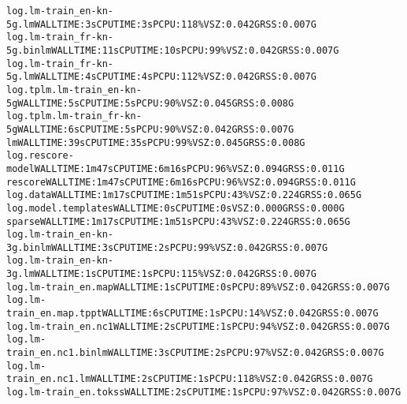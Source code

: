 \documentclass[11pt,letterpaper]{article}
\begin{document}
\begin{tiny}
\begin{alltt}
         log.lm-train_en-kn-5g.lm                         WALL TIME: 3s       CPU TIME: 3s        PCPU: 118\%   VSZ: 0.042G    RSS: 0.007G
         log.lm-train_fr-kn-5g.binlm                      WALL TIME: 11s      CPU TIME: 10s       PCPU: 99\%    VSZ: 0.042G    RSS: 0.007G
         log.lm-train_fr-kn-5g.lm                         WALL TIME: 4s       CPU TIME: 4s        PCPU: 112\%   VSZ: 0.042G    RSS: 0.007G
         log.tplm.lm-train_en-kn-5g                       WALL TIME: 5s       CPU TIME: 5s        PCPU: 90\%    VSZ: 0.045G    RSS: 0.008G
         log.tplm.lm-train_fr-kn-5g                       WALL TIME: 6s       CPU TIME: 5s        PCPU: 90\%    VSZ: 0.042G    RSS: 0.007G
      lm                                                  WALL TIME: 39s      CPU TIME: 35s       PCPU: 99\%    VSZ: 0.045G    RSS: 0.008G
         log.rescore-model                                WALL TIME: 1m47s    CPU TIME: 6m16s     PCPU: 96\%    VSZ: 0.094G    RSS: 0.011G
      rescore                                             WALL TIME: 1m47s    CPU TIME: 6m16s     PCPU: 96\%    VSZ: 0.094G    RSS: 0.011G
         log.data                                         WALL TIME: 1m17s    CPU TIME: 1m51s     PCPU: 43\%    VSZ: 0.224G    RSS: 0.065G
         log.model.templates                              WALL TIME: 0s       CPU TIME: 0s                     VSZ: 0.000G    RSS: 0.000G
      sparse                                              WALL TIME: 1m17s    CPU TIME: 1m51s     PCPU: 43\%    VSZ: 0.224G    RSS: 0.065G
         log.lm-train_en-kn-3g.binlm                      WALL TIME: 3s       CPU TIME: 2s        PCPU: 99\%    VSZ: 0.042G    RSS: 0.007G
         log.lm-train_en-kn-3g.lm                         WALL TIME: 1s       CPU TIME: 1s        PCPU: 115\%   VSZ: 0.042G    RSS: 0.007G
         log.lm-train_en.map                              WALL TIME: 1s       CPU TIME: 0s        PCPU: 89\%    VSZ: 0.042G    RSS: 0.007G
         log.lm-train_en.map.tppt                         WALL TIME: 6s       CPU TIME: 1s        PCPU: 14\%    VSZ: 0.042G    RSS: 0.007G
         log.lm-train_en.nc1                              WALL TIME: 2s       CPU TIME: 1s        PCPU: 94\%    VSZ: 0.042G    RSS: 0.007G
         log.lm-train_en.nc1.binlm                        WALL TIME: 3s       CPU TIME: 2s        PCPU: 97\%    VSZ: 0.042G    RSS: 0.007G
         log.lm-train_en.nc1.lm                           WALL TIME: 2s       CPU TIME: 1s        PCPU: 118\%   VSZ: 0.042G    RSS: 0.007G
         log.lm-train_en.tokss                            WALL TIME: 2s       CPU TIME: 1s        PCPU: 97\%    VSZ: 0.042G    RSS: 0.007G

\end{alltt}
\end{tiny}
\end{document}
